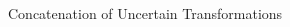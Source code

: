 \documentclass[14pt,aspectratio=169]{beamer}
\begin{document}
\begin{frame}[fragile]{Concatenation of Uncertain Transformations}
\begin{columns}
\begin{column}{0.4\textwidth}
{
}
\end{column}
\end{columns}
\end{frame}
\end{document}
